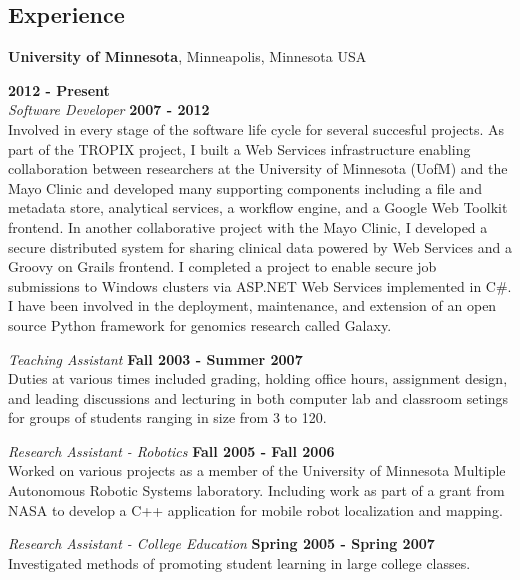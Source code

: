 \documentclass[margin,line]{res}
\begin{document}
\begin{resume}
{\section{\sc Experience}}
{\bf University of Minnesota}, Minneapolis, Minnesota USA

\vspace{-.3cm}
\vspace{-.1cm}{\em Senior Software Developer} \hfill {\bf 2012 - Present}\\
{\em Software Developer} \hfill {\bf 2007 - 2012}\\
Involved in every stage of the software life cycle for several succesful projects. As part of the TROPIX
project, I built a Web Services infrastructure enabling collaboration between researchers at the
University of Minnesota (UofM) and the Mayo Clinic and developed many supporting components
including a file and metadata store, analytical services, a workflow engine, and a Google Web Toolkit
frontend. In another collaborative project with the Mayo Clinic, I developed a secure distributed
system for sharing clinical data powered by Web Services and a Groovy on Grails frontend. I
completed a project to enable secure job submissions to Windows clusters via ASP.NET Web Services
implemented in C\#. I have been involved in the deployment, maintenance, and extension of an open
source Python framework for genomics research called Galaxy.

{\em Teaching Assistant} \hfill {\bf Fall 2003  - Summer 2007}\\
Duties at various times included grading, holding office hours,
assignment design, and leading discussions and lecturing in both
computer lab and classroom setings for groups of students ranging in
size from 3 to 120.

\vspace{-.1cm}
{\em Research Assistant - Robotics} \hfill {\bf Fall 2005 - Fall 2006}\\
Worked on various projects as a member of the University of Minnesota
Multiple Autonomous Robotic Systems laboratory. Including work as part
of a grant from NASA to develop a C++ application for mobile
robot localization and mapping.

\vspace{-.1cm}
{\em Research Assistant - College Education} \hfill {\bf Spring 2005 - Spring 2007}\\
Investigated methods of promoting student learning in large college classes. 


\end{resume}
\end{document}
